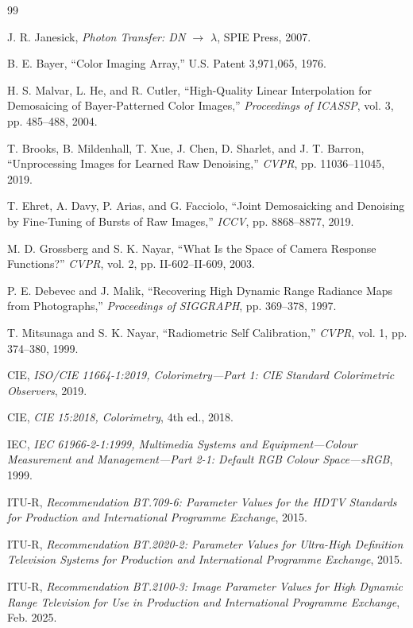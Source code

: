 \begin{thebibliography}{99}
\begin{LTR}
J. R. Janesick,
\emph{Photon Transfer: DN $\to$ $\lambda$}, SPIE Press, 2007.

B. E. Bayer,
``Color Imaging Array,'' U.S. Patent 3,971,065, 1976.

H. S. Malvar, L. He, and R. Cutler,
``High-Quality Linear Interpolation for Demosaicing of Bayer-Patterned Color Images,''
\emph{Proceedings of ICASSP}, vol. 3, pp. 485--488, 2004.

T. Brooks, B. Mildenhall, T. Xue, J. Chen, D. Sharlet, and J. T. Barron,
``Unprocessing Images for Learned Raw Denoising,''
\emph{CVPR}, pp. 11036--11045, 2019.

T. Ehret, A. Davy, P. Arias, and G. Facciolo,
``Joint Demosaicking and Denoising by Fine-Tuning of Bursts of Raw Images,''
\emph{ICCV}, pp. 8868--8877, 2019.

M. D. Grossberg and S. K. Nayar,
``What Is the Space of Camera Response Functions?''
\emph{CVPR}, vol. 2, pp. II-602--II-609, 2003.

P. E. Debevec and J. Malik,
``Recovering High Dynamic Range Radiance Maps from Photographs,''
\emph{Proceedings of SIGGRAPH}, pp. 369--378, 1997.

T. Mitsunaga and S. K. Nayar,
``Radiometric Self Calibration,''
\emph{CVPR}, vol. 1, pp. 374--380, 1999.

CIE,
\emph{ISO/CIE 11664-1:2019, Colorimetry---Part 1: CIE Standard Colorimetric Observers}, 2019.

CIE,
\emph{CIE 15:2018, Colorimetry}, 4th ed., 2018.

IEC,
\emph{IEC 61966-2-1:1999, Multimedia Systems and Equipment---Colour Measurement and Management---Part 2-1: Default RGB Colour Space---sRGB}, 1999.

ITU-R,
\emph{Recommendation BT.709-6: Parameter Values for the HDTV Standards for Production and International Programme Exchange}, 2015.

ITU-R,
\emph{Recommendation BT.2020-2: Parameter Values for Ultra-High Definition Television Systems for Production and International Programme Exchange}, 2015.

ITU-R,
\emph{Recommendation BT.2100-3: Image Parameter Values for High Dynamic Range Television for Use in Production and International Programme Exchange}, Feb. 2025.


\end{LTR}
\end{thebibliography}
